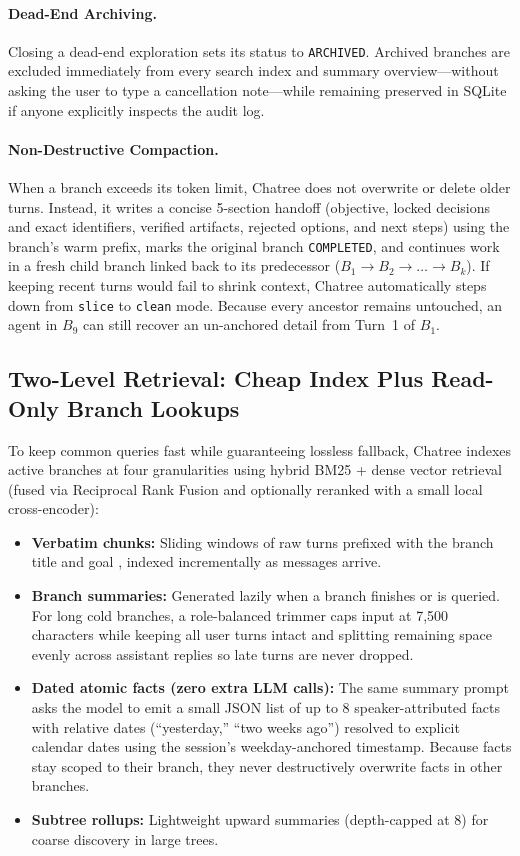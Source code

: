\documentclass[10pt,twocolumn]{article}
\begin{document}
\paragraph{Dead-End Archiving.}
Closing a dead-end exploration sets its status to \texttt{ARCHIVED}. Archived branches are excluded immediately from every search index and summary overview—without asking the user to type a cancellation note—while remaining preserved in SQLite if anyone explicitly inspects the audit log.

\paragraph{Non-Destructive Compaction.}
When a branch exceeds its token limit, Chatree does not overwrite or delete older turns. Instead, it writes a concise 5-section handoff (objective, locked decisions and exact identifiers, verified artifacts, rejected options, and next steps) using the branch's warm prefix, marks the original branch \texttt{COMPLETED}, and continues work in a fresh child branch linked back to its predecessor ($B_1 \to B_2 \to \dots \to B_k$). If keeping recent turns would fail to shrink context, Chatree automatically steps down from \texttt{slice} to \texttt{clean} mode. Because every ancestor remains untouched, an agent in $B_9$ can still recover an un-anchored detail from Turn~1 of $B_1$.

\subsection{Two-Level Retrieval: Cheap Index Plus Read-Only Branch Lookups}
To keep common queries fast while guaranteeing lossless fallback, Chatree indexes active branches at four granularities using hybrid BM25 + dense vector retrieval (fused via Reciprocal Rank Fusion \citep{cormack2009rrf} and optionally reranked with a small local cross-encoder):
\begin{itemize}
  \item \textbf{Verbatim chunks:} Sliding windows of raw turns prefixed with the branch title and goal \citep{anthropic2024contextual}, indexed incrementally as messages arrive.
  \item \textbf{Branch summaries:} Generated lazily when a branch finishes or is queried. For long cold branches, a role-balanced trimmer caps input at 7,500 characters while keeping all user turns intact and splitting remaining space evenly across assistant replies so late turns are never dropped.
  \item \textbf{Dated atomic facts (zero extra LLM calls):} The same summary prompt asks the model to emit a small JSON list of up to 8 speaker-attributed facts with relative dates (``yesterday,'' ``two weeks ago'') resolved to explicit calendar dates using the session's weekday-anchored timestamp. Because facts stay scoped to their branch, they never destructively overwrite facts in other branches.
  \item \textbf{Subtree rollups:} Lightweight upward summaries (depth-capped at 8) for coarse discovery in large trees.
\end{itemize}
\end{document}
